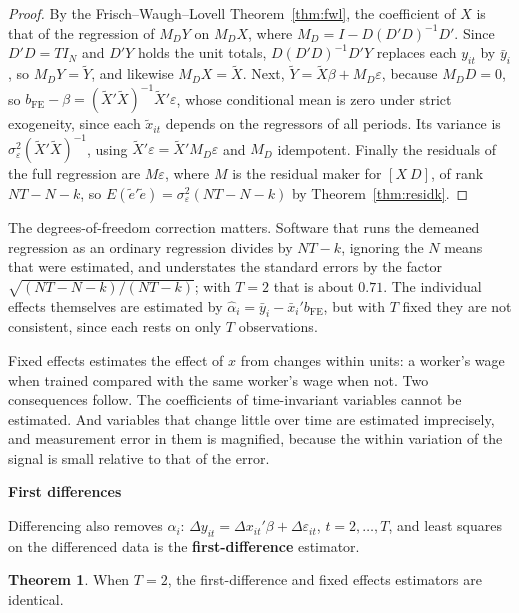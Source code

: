 \documentclass[11pt,a4paper]{article}
\numberwithin{equation}{section}
\theoremstyle{definition}
\newtheorem{thm}{Theorem}[subsection]
\newcommand{\subhead}[1]{%
  \par\medskip\noindent\textbf{#1}\par\nobreak\smallskip}
\begin{document}
\begin{proof}
By the Frisch--Waugh--Lovell Theorem~\ref{thm:fwl}, the coefficient of $X$ is that of the regression of $M_DY$ on $M_DX$, where $M_D = I - D(D'D)^{-1}D'$. Since $D'D = TI_N$ and
$D'Y$ holds the unit totals, $D(D'D)^{-1}D'Y$ replaces each $y_{it}$ by $\bar y_i$, so $M_DY = \tilde Y$, and likewise $M_DX = \tilde X$. Next, $\tilde Y = \tilde X\beta + M_D\varepsilon$, because $M_DD = 0$, so
$b_{\text{FE}} - \beta = (\tilde X'\tilde X)^{-1}\tilde X'\varepsilon$, whose conditional mean is zero under strict exogeneity, since each $\tilde x_{it}$ depends on the regressors of all periods. Its variance
is $\sigma_\varepsilon^2(\tilde X'\tilde X)^{-1}$, using $\tilde X'\varepsilon = \tilde X'M_D\varepsilon$ and $M_D$ idempotent. Finally the residuals of the full regression are $M\varepsilon$, where $M$ is the residual maker for
$[X\ D]$, of rank $NT - N - k$, so $E(\tilde e'\tilde e) = \sigma_\varepsilon^2(NT - N - k)$ by Theorem~\ref{thm:residk}.
\end{proof}

The degrees-of-freedom correction matters. Software that runs the demeaned regression as an ordinary regression divides by $NT - k$, ignoring the
$N$ means that were estimated, and understates the standard errors by the factor $\sqrt{(NT - N - k)/(NT - k)}$; with $T = 2$ that is about $0.71$. The individual
effects themselves are estimated by $\hat\alpha_i = \bar y_i - \bar x_i'b_{\text{FE}}$, but with $T$ fixed they are not consistent, since each rests on only $T$ observations.

Fixed effects estimates the effect of $x$ from changes within units: a worker's wage when trained compared with the same worker's wage when not.
Two consequences follow. The coefficients of time-invariant variables cannot be estimated. And variables that change little over time are
estimated imprecisely, and measurement error in them is magnified, because the within variation of the signal is small relative to that of the
error.

\subhead{First differences}
Differencing also removes $\alpha_i$: $\Delta y_{it} = \Delta x_{it}'\beta + \Delta\varepsilon_{it}$, $t = 2, \dots, T$, and least squares on the differenced data is the \textbf{first-difference} estimator.

\begin{thm}
\label{thm:fdfe}
When $T = 2$, the first-difference and fixed effects estimators are identical.
\end{thm}
\end{document}
